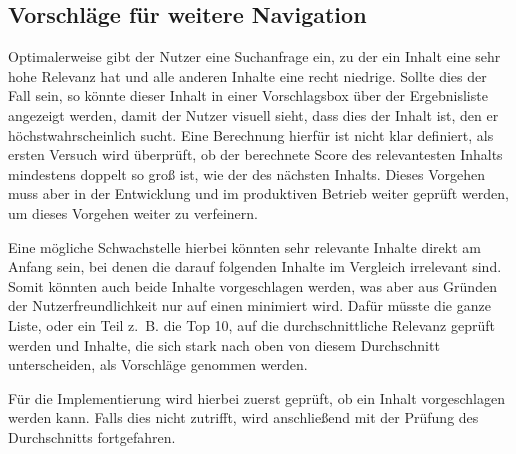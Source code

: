 \subsection{Vorschläge für weitere Navigation}
\label{sub:suggestion}
Optimalerweise gibt der Nutzer eine Suchanfrage ein, zu der ein Inhalt eine sehr hohe Relevanz hat und alle anderen Inhalte eine recht niedrige.
Sollte dies der Fall sein, so könnte dieser Inhalt in einer Vorschlagsbox über der Ergebnisliste angezeigt werden, damit der Nutzer visuell sieht, dass dies der Inhalt ist, den er höchstwahrscheinlich sucht.
Eine Berechnung hierfür ist nicht klar definiert, als ersten Versuch wird überprüft, ob der berechnete Score des relevantesten Inhalts mindestens doppelt so groß ist, wie der des nächsten Inhalts.
Dieses Vorgehen muss aber in der Entwicklung und im produktiven Betrieb weiter geprüft werden, um dieses Vorgehen weiter zu verfeinern.

Eine mögliche Schwachstelle hierbei könnten sehr relevante Inhalte direkt am Anfang sein, bei denen die darauf folgenden Inhalte im Vergleich irrelevant sind.
Somit könnten auch beide Inhalte vorgeschlagen werden, was aber aus Gründen der Nutzerfreundlichkeit nur auf einen minimiert wird.
Dafür müsste die ganze Liste, oder ein Teil z. B. die Top 10, auf die durchschnittliche Relevanz geprüft werden und Inhalte, die sich stark nach oben von diesem Durchschnitt unterscheiden, als Vorschläge genommen werden.

Für die Implementierung wird hierbei zuerst geprüft, ob ein Inhalt vorgeschlagen werden kann. Falls dies nicht zutrifft, wird anschließend mit der Prüfung des Durchschnitts fortgefahren.
